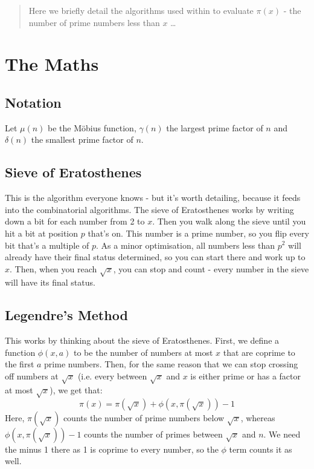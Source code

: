 \documentclass[12pt]{article}
\begin{document}
\maketitle

\begin{abstract}
Here we briefly detail the algorithms used within to evaluate $\pi(x)$ - the number of prime numbers less than $x$ \ldots
\end{abstract}

\section{The Maths}
\subsection{Notation}
Let $\mu(n)$ be the M\"{o}bius function, $\gamma(n)$ the largest prime factor of $n$ and $\delta(n)$ the smallest prime factor of $n$.

\subsection{Sieve of Eratosthenes}
This is the algorithm everyone knows - but it's worth detailing, because it feeds into the combinatorial algorithms.
The sieve of Eratosthenes works by writing down a bit for each number from 2 to $x$. Then you walk along the sieve
until you hit a bit at position $p$ that's on. This number is a prime number, so you flip every bit that's a multiple
of $p$. As a minor optimisation, all numbers less than $p^2$ will already have their final status determined, so you
can start there and work up to $x$. Then, when you reach $\sqrt{x}$, you can stop and count - every number in the sieve
will have its final status.

\subsection{Legendre's Method}
This works by thinking about the sieve of Eratosthenes. First, we define a function $\phi(x,a)$ to be the number of
numbers at most $x$ that are coprime to the first $a$ prime numbers. Then, for the same reason that we can stop
crossing off numbers at $\sqrt{x}$ (i.e. every between $\sqrt{x}$ and $x$ is either prime or has a factor at
most $\sqrt{x}$), we get that:
$$\pi(x) = \pi\left(\sqrt{x}\right) + \phi\left(x, \pi\left(\sqrt{x}\right)\right) - 1$$
Here, $\pi\left(\sqrt{x}\right)$ counts the number of prime numbers below $\sqrt{x}$, whereas 
$\phi\left(x, \pi\left(\sqrt{x}\right)\right) - 1$ counts the number of primes between $\sqrt{x}$ and $n$. We need the
minus 1 there as 1 is coprime to every number, so the $\phi$ term counts it as well.
\end{document}
